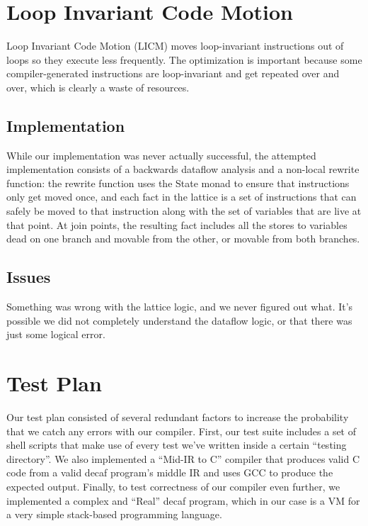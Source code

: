 \documentclass[11pt]{article}
\begin{document}

\section{Loop Invariant Code Motion}

Loop Invariant Code Motion (LICM) moves loop-invariant instructions
out of loops so they execute less frequently. The optimization is
important because some compiler-generated instructions are
loop-invariant and get repeated over and over, which is clearly a
waste of resources.

\subsection{Implementation}
While our implementation was never actually
successful, the attempted implementation consists of a backwards dataflow
analysis and a non-local rewrite function: the rewrite function uses
the State monad to ensure that instructions only get moved once, and
each fact in the lattice is a set of instructions that can safely be moved to
that instruction along with the set of variables that are live at that
point. At join points, the resulting fact includes all the stores to
variables dead on one branch and movable from the other, or movable
from both branches.

\subsection{Issues}

Something was wrong with the lattice logic, and we never figured out
what. It's possible we did not completely understand the dataflow
logic, or that there was just some logical error.

\section {Test Plan}
\label{sec:test}

Our test plan consisted of several redundant factors to increase the
probability that we catch any errors with our compiler. First, our
test suite includes a set of shell scripts that make use of every test
we've written inside a certain ``testing directory''. We also
implemented a ``Mid-IR to C'' compiler that produces valid C code from
a valid decaf program's middle IR and uses GCC to produce the expected
output. Finally, to test correctness of our compiler even further, we
implemented a complex and ``Real'' decaf program, which in our case is a
VM for a very simple stack-based programming language.
\end{document}
